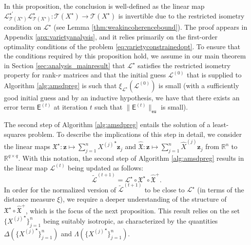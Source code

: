 \documentclass[11pt,letterpaper]{article}
\newcommand{\R}{\mathbb{R}}
\newcommand{\bz}{\mathbf{z}}
\renewcommand{\L}{\mathcal{L}}
\newcommand{\ct}{\mathcal{T}}
\newcommand{\xx}{\mathfrak{X}}
\newcommand{\sfe}{\mathsf{E}}
\newcommand{\eu}{\mathsf{eu}}
\begin{document}
In this proposition, the conclusion is well-defined as the linear map ${\L^{\star\prime}_{\ct(X^\star)}} \L^\star_{\ct(X^\star)} : \ct(X^\star) \rightarrow \ct(X^\star)$ is invertible due to the restricted isometry condition on $\L^\star$ (see Lemma \ref{thm:weakincoherencebound}).  The proof appears in Appendix \ref{apx:varietyanalysis}, and it relies primarily on the first-order optimality conditions of the problem \eqref{eq:varietyconstrainedopt}.  To ensure that the conditions required by this proposition hold, we assume in our main theorem in Section \ref{sec:analysis_mainresult} that $\L^\star$ satisfies the restricted isometry property for rank-$r$ matrices and that the initial guess $\L^{(0)}$ that is supplied to Algorithm \ref{alg:amsdpreg} is such that $\xi_{\L^\star}(\L^{(0)})$ is small (with a sufficiently good initial guess and by an inductive hypothesis, we have that there exists an error term $\sfe^{(t)}$ at iteration $t$ such that $\|\sfe^{(t)}\|_{\eu}$ is small).

The second step of Algorithm \ref{alg:amsdpreg} entails the solution of a least-squares problem.  To describe the implications of this step in detail, we consider the linear maps $\xx^\star : \bz \mapsto \sum_{j=1}^n {X^{(j)}}^\star \bz_j$ and $\hat{\xx} :   \bz \mapsto \sum_{j=1}^n \hat{X}^{(j)} \bz_j$ from $\R^n$ to $\R^{q \times q}$.  With this notation, the second step of Algorithm \ref{alg:amsdpreg} results in the linear map $\L^{(t)}$ being updated as follows:
\begin{equation} \label{eq:intermediatedictestimate}
\tilde{\L}^{(t+1)} = \L^\star \circ \xx^\star \circ \hat{\xx}^+.
\end{equation}
In order for the normalized version of $\tilde{\L}^{(t+1)}$ to be close to $\L^\star$ (in terms of the distance measure $\xi$), we require a deeper understanding of the structure of $\xx^\star \circ \hat{\xx}^+$, which is the focus of the next proposition.  This result relies on the set $\{{X^{(j)}}^\star\}_{j=1}^n$ being suitably isotropic, as characterized by the quantities $\Delta\!\left(\{{X^{(j)}}^\star\}_{j=1}^n \right)$ and $\Lambda\!\left(\{{X^{(j)}}^\star\}_{j=1}^n\right)$.
\end{document}

